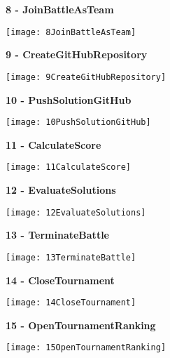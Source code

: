 \begin{minipage}{\textwidth}
	\textbf{8 - JoinBattleAsTeam}
	\begin{center}
		\texttt{[image: 8JoinBattleAsTeam]}
	\end{center}
\end{minipage}

\begin{minipage}{\textwidth}
	\textbf{9 - CreateGitHubRepository}
	\begin{center}
		\texttt{[image: 9CreateGitHubRepository]}
	\end{center}
\end{minipage}

\begin{minipage}{\textwidth}
	\textbf{10 - PushSolutionGitHub}
	\begin{center}
		\texttt{[image: 10PushSolutionGitHub]}
	\end{center}
\end{minipage}

\begin{minipage}{\textwidth}
	\textbf{11 - CalculateScore}
	\begin{center}
		\texttt{[image: 11CalculateScore]}
	\end{center}
\end{minipage}

\begin{minipage}{\textwidth}
	\textbf{12 - EvaluateSolutions}
	\begin{center}
		\texttt{[image: 12EvaluateSolutions]}
	\end{center}
\end{minipage}

\begin{minipage}{\textwidth}
	\textbf{13 - TerminateBattle}
	\begin{center}
		\texttt{[image: 13TerminateBattle]}
	\end{center}
\end{minipage}

\begin{minipage}{\textwidth}
	\textbf{14 - CloseTournament}
	\begin{center}
		\texttt{[image: 14CloseTournament]}
	\end{center}
\end{minipage}

\begin{minipage}{\textwidth}
	\textbf{15 - OpenTournamentRanking}
	\begin{center}
		\texttt{[image: 15OpenTournamentRanking]}
	\end{center}
\end{minipage}

